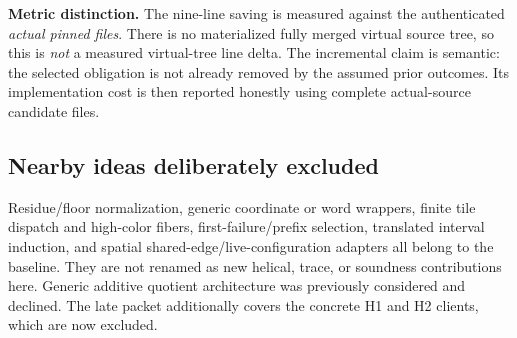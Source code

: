 \textbf{Metric distinction.} The nine-line saving is measured against the authenticated \emph{actual pinned files}. There is no materialized fully merged virtual source tree, so this is \emph{not} a measured virtual-tree line delta. The incremental claim is semantic: the selected obligation is not already removed by the assumed prior outcomes. Its implementation cost is then reported honestly using complete actual-source candidate files.

\subsection{Nearby ideas deliberately excluded}
Residue/floor normalization, generic coordinate or word wrappers, finite tile dispatch and high-color fibers, first-failure/prefix selection, translated interval induction, and spatial shared-edge/live-configuration adapters all belong to the baseline. They are not renamed as new helical, trace, or soundness contributions here. Generic additive quotient architecture was previously considered and declined. The late packet additionally covers the concrete H1 and H2 clients, which are now excluded.

